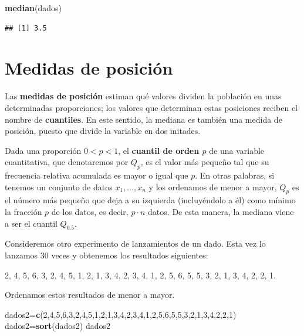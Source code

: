 \documentclass[]{book}
\newenvironment{Shaded}{\begin{snugshade}}{\end{snugshade}}
\newcommand{\DecValTok}[1]{\textcolor[rgb]{0.00,0.00,0.81}{#1}}
\newcommand{\KeywordTok}[1]{\textcolor[rgb]{0.13,0.29,0.53}{\textbf{#1}}}
\newcommand{\NormalTok}[1]{#1}
\theoremstyle{definition}
\theoremstyle{definition}
\theoremstyle{definition}
\theoremstyle{remark}
\let\BeginKnitrBlock\begin \let\EndKnitrBlock\end
\begin{document}
\begin{Shaded}
\begin{Highlighting}[]
\KeywordTok{median}\NormalTok{(dados)}
\end{Highlighting}
\end{Shaded}

\begin{verbatim}
## [1] 3.5
\end{verbatim}

\hypertarget{medidas-de-posicion}{%
\section{Medidas de posición}\label{medidas-de-posicion}}

Las \textbf{medidas de posición} estiman qué valores dividen la población en unas determinadas proporciones; los valores que determinan estas posiciones reciben el nombre de \textbf{cuantiles}. En este sentido, la mediana es también una medida de posición, puesto que divide la variable en dos mitades.

Dada una proporción \(0<p<1\), el \textbf{cuantil de orden \(p\)} de una variable cuantitativa, que denotaremos por \(Q_p\), es el valor más pequeño tal que su frecuencia relativa acumulada es mayor o igual que \(p\). En otras palabras, si tenemos un conjunto de datos \(x_1, \ldots, x_n\) y los ordenamos de menor a mayor, \(Q_p\) es el número más pequeño que deja a su izquierda (incluyéndolo a él) como mínimo la fracción \(p\) de los datos, es decir, \(p\cdot n\) datos.
De esta manera, la mediana viene a ser el cuantil \(Q_{0.5}\).

\BeginKnitrBlock{example}
\protect\hypertarget{exm:ex184}{}{\label{exm:ex184} }Consideremos otro experimento de lanzamientos de un dado. Esta vez lo lanzamos 30 veces y obtenemos los resultados siguientes:
\EndKnitrBlock{example}

2, 4, 5, 6, 3, 2, 4, 5, 1, 2, 1, 3, 4, 2, 3, 4, 1, 2, 5, 6, 5, 5, 3, 2, 1, 3, 4, 2, 2, 1.

Ordenamos estos resultados de menor a mayor.

\begin{Shaded}
\begin{Highlighting}[]
\NormalTok{dados2=}\KeywordTok{c}\NormalTok{(}\DecValTok{2}\NormalTok{,}\DecValTok{4}\NormalTok{,}\DecValTok{5}\NormalTok{,}\DecValTok{6}\NormalTok{,}\DecValTok{3}\NormalTok{,}\DecValTok{2}\NormalTok{,}\DecValTok{4}\NormalTok{,}\DecValTok{5}\NormalTok{,}\DecValTok{1}\NormalTok{,}\DecValTok{2}\NormalTok{,}\DecValTok{1}\NormalTok{,}\DecValTok{3}\NormalTok{,}\DecValTok{4}\NormalTok{,}\DecValTok{2}\NormalTok{,}\DecValTok{3}\NormalTok{,}\DecValTok{4}\NormalTok{,}\DecValTok{1}\NormalTok{,}\DecValTok{2}\NormalTok{,}\DecValTok{5}\NormalTok{,}\DecValTok{6}\NormalTok{,}\DecValTok{5}\NormalTok{,}\DecValTok{5}\NormalTok{,}\DecValTok{3}\NormalTok{,}\DecValTok{2}\NormalTok{,}\DecValTok{1}\NormalTok{,}\DecValTok{3}\NormalTok{,}\DecValTok{4}\NormalTok{,}\DecValTok{2}\NormalTok{,}\DecValTok{2}\NormalTok{,}\DecValTok{1}\NormalTok{)}
\NormalTok{dados2=}\KeywordTok{sort}\NormalTok{(dados2)}
\NormalTok{dados2}
\end{Highlighting}
\end{Shaded}
\end{document}
